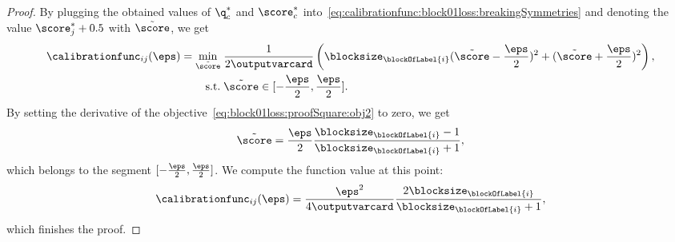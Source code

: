 \documentclass{article}
\begin{document}
\begin{proof}
    By plugging the obtained values of $\q_c^*$ and $\score_c^*$ into~\eqref{eq:calibrationfunc:block01loss:breakingSymmetries} and denoting the value $\score_{j}^* + 0.5$ with $\tilde{\score}$, we get
    \begin{align}
    \label{eq:block01loss:proofSquare:obj2}
    \calibrationfunc_{ij}(\eps) = \min_{\tilde{\score}} \; &\frac{1}{2\outputvarcard}  \left( \blocksize_{\blockOfLabel{i}} (\tilde{\score} - \frac{\eps}{2})^2 + (\tilde{\score} + \frac{\eps}{2})^2 \right),\\
    \notag
    \mbox{s.t.}\; & \tilde{\score} \in [-\frac{\eps}{2}, \frac{\eps}{2}].
    \end{align}
    By setting the derivative of the objective~\eqref{eq:block01loss:proofSquare:obj2} to zero, we get
    $$
    \tilde{\score} = \frac{\eps}{2} \frac{\blocksize_{\blockOfLabel{i}} - 1}{\blocksize_{\blockOfLabel{i}} + 1},
    $$
    which belongs to the segment $[-\frac{\eps}{2}, \frac{\eps}{2}]$.
    We compute the function value at this point:
    $$
    \calibrationfunc_{ij} (\eps) = \frac{\eps^2}{4\outputvarcard} \frac{2\blocksize_{\blockOfLabel{i}}}{\blocksize_{\blockOfLabel{i}}+1},
    $$
    which finishes the proof.
\end{proof}
\end{document}

